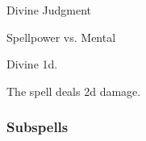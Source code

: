 \newpage
\begin{spellsection}{Divine Judgment}

\begin{spellheader}
\end{spellheader}

\begin{spellcontent}

\begin{spelltargetinginfo}




\end{spelltargetinginfo}


\begin{spelleffects}




\begin{spellattack}{Spellpower vs. Mental}


\hit Divine  \plus1d.


\end{spellattack}



\end{spelleffects}

\end{spellcontent}
\begin{spellfooter}


\end{spellfooter}
\begin{spellsubcontent}


\begin{spellcantrip}
The spell deals \minus2d damage.
\end{spellcantrip}


\end{spellsubcontent}
\end{spellsection}


\subsubsection{Subspells}





